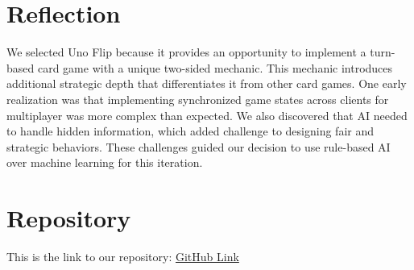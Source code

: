\documentclass[12pt]{article}
\begin{document}
\section*{Reflection}
We selected Uno Flip because it provides an opportunity to implement a turn-based card game with a unique two-sided mechanic. This mechanic introduces additional strategic depth that differentiates it from other card games. One early realization was that implementing synchronized game states across clients for multiplayer was more complex than expected. We also discovered that AI needed to handle hidden information, which added challenge to designing fair and strategic behaviors. These challenges guided our decision to use rule-based AI over machine learning for this iteration.

\section*{Repository}
This is the link to our repository:
\href{https://github.com/simon-0215/UNO-Flip-3D}{GitHub Link}
\end{document}
